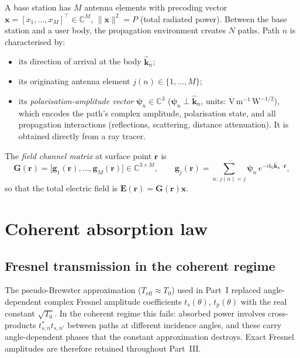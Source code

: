 \documentclass[11pt,a4paper]{article}
\theoremstyle{definition}
\newcommand{\Teff}{T_{\mathrm{eff}}}
\begin{document}
A base station has $M$ antenna elements with precoding vector
$\mathbf{x}=[x_1,\ldots,x_M]^\top\in\mathbb{C}^M$,
$\|\mathbf{x}\|^2=P$ (total radiated power).  Between the base station
and a user body, the propagation environment creates $N$ paths.  Path
$n$ is characterised by:
\begin{itemize}[noitemsep]
  \item its direction of arrival at the body $\hat{\mathbf{k}}_n$;
  \item its originating antenna element $j(n)\in\{1,\ldots,M\}$;
  \item its \emph{polarisation-amplitude vector}
        $\boldsymbol{\psi}_n\in\mathbb{C}^3$
        ($\boldsymbol{\psi}_n\perp\hat{\mathbf{k}}_n$,
        units: $\mathrm{V\,m^{-1}\,W^{-1/2}}$), which encodes the path's
        complex amplitude, polarisation state, and all propagation interactions
        (reflections, scattering, distance attenuation).  It is obtained
        directly from a ray tracer.
\end{itemize}
The \emph{field channel matrix} at surface point $\mathbf{r}$ is
\begin{equation}\label{eq:G-def}
  \mathbf{G}(\mathbf{r})
  = \bigl[\mathbf{g}_1(\mathbf{r}),\ldots,\mathbf{g}_M(\mathbf{r})\bigr]
  \in\mathbb{C}^{3\times M},
  \qquad
  \mathbf{g}_j(\mathbf{r}) = \sum_{n:\,j(n)=j}
    \boldsymbol{\psi}_n\,e^{-ik_0\hat{\mathbf{k}}_n\cdot\mathbf{r}},
\end{equation}
so that the total electric field is $\mathbf{E}(\mathbf{r})=\mathbf{G}(\mathbf{r})\mathbf{x}$.

\section{Coherent absorption law}\label{sec:coherent-law}

\subsection{Fresnel transmission in the coherent regime}

The pseudo-Brewster approximation ($\Teff\approx T_0$) used in Part~I
replaced angle-dependent complex Fresnel amplitude coefficients
$t_s(\theta)$, $t_p(\theta)$ with the real constant $\sqrt{T_0}$.  In
the coherent regime this fails: absorbed power involves cross-products
$t_{s,n}^*t_{s,n'}$ between paths at different incidence angles, and
these carry angle-dependent phases that the constant approximation
destroys.  Exact Fresnel amplitudes are therefore retained throughout
Part~III.
\end{document}
